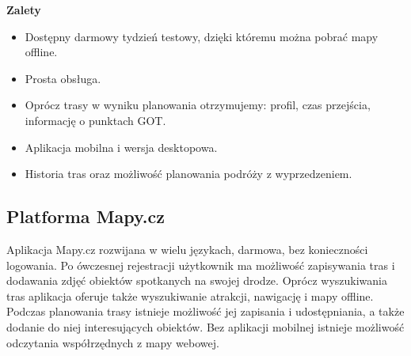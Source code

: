 \textbf{Zalety}
\begin{itemize}
    \item Dostępny darmowy tydzień testowy, dzięki któremu można pobrać mapy offline.
    \item Prosta obsługa.
    \item Oprócz trasy w wyniku planowania otrzymujemy: profil, czas przejścia, informację o punktach GOT.
    \item Aplikacja mobilna i wersja desktopowa.
    \item Historia tras oraz możliwość planowania podróży z wyprzedzeniem.
\end{itemize}

\subsection{Platforma Mapy.cz}
Aplikacja Mapy.cz \cite{mapycz} rozwijana w wielu językach, darmowa, bez konieczności logowania. Po ówczesnej rejestracji użytkownik ma możliwość zapisywania tras i dodawania zdjęć obiektów spotkanych na swojej drodze. Oprócz wyszukiwania tras aplikacja oferuje także wyszukiwanie atrakcji, nawigację i mapy offline. Podczas planowania trasy istnieje możliwość jej zapisania i udostępniania, a także dodanie do niej interesujących obiektów. Bez aplikacji mobilnej istnieje możliwość odczytania współrzędnych z mapy webowej.

